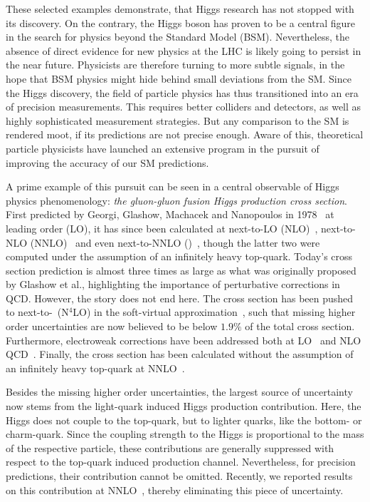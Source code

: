 These selected examples demonstrate, that Higgs research has not stopped with its discovery. On the contrary, the Higgs boson has proven to be a central figure in the search for physics beyond the Standard Model (\acs{BSM}). Nevertheless, the absence of direct evidence for new physics at the LHC is likely going to persist in the near future. Physicists are therefore turning to more subtle signals, in the hope that \acs{BSM} physics might hide behind small deviations from the \acs{SM}. Since the Higgs discovery, the field of particle physics has thus transitioned into an era of precision measurements. This requires better colliders and detectors, as well as highly sophisticated measurement strategies. But any comparison to the \acs{SM} is rendered moot, if its predictions are not precise enough. Aware of this, theoretical particle physicists have launched an extensive program in the pursuit of improving the accuracy of our \acs{SM} predictions.

A prime example of this pursuit can be seen in a central observable of Higgs physics phenomenology: \textit{the gluon-gluon fusion Higgs production cross section}. First predicted by Georgi, Glashow, Machacek and Nanopoulos in 1978~\cite{Georgi:1977gs} at leading order (\acs{LO}), it has since been calculated at next-to-\acs{LO} (\acs{NLO})~\cite{Dawson:1990zj,Djouadi:1991tka}, next-to-\acs{NLO} (\acs{NNLO})~\cite{Catani:2001ic, Harlander:2002wh,Anastasiou:2002yz} and even next-to-\acs{NNLO} (\NNNLO)~\cite{Anastasiou:2015vya,Mistlberger:2018etf}, though the latter two were computed under the assumption of an infinitely heavy top-quark. Today's cross section prediction is almost three times as large as what was originally proposed by Glashow et al., highlighting the importance of perturbative corrections in \acs{QCD}. However, the story does not end here. The cross section has been pushed to next-to-\NNNLO\ (N${}^4$LO) in the soft-virtual approximation~\cite{Das:2020adl}, such that missing higher order uncertainties are now believed to be below $1.9\%$ of the total cross section. Furthermore, electroweak corrections have been addressed both at \acs{LO}~\cite{Aglietti:2004nj,Degrassi:2004mx} and \acs{NLO} \acs{QCD}~\cite{Actis:2008ts, Actis:2008ug,Anastasiou:2008tj,Anastasiou:2018adr,Bonetti:2018ukf,Becchetti:2020wof}. Finally, the cross section has been calculated without the assumption of an infinitely heavy top-quark at \acs{NNLO}~\cite{Czakon:2021yub}.

Besides the missing higher order uncertainties, the largest source of uncertainty now stems from the light-quark induced Higgs production contribution. Here, the Higgs does not couple to the top-quark, but to lighter quarks, like the bottom- or charm-quark. Since the coupling strength to the Higgs is proportional to the mass of the respective particle, these contributions are generally suppressed with respect to the top-quark induced production channel. Nevertheless, for precision predictions, their contribution cannot be omitted. Recently, we reported results on this contribution at \acs{NNLO}~\cite{Czakon:2023kqm, Czakon:2024ywb}, thereby eliminating this piece of uncertainty.

